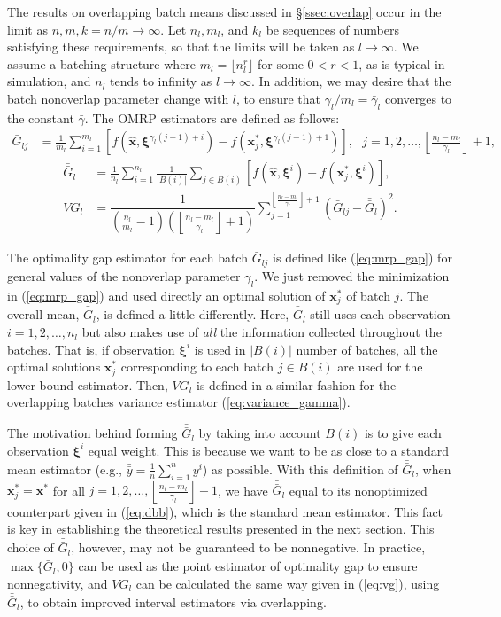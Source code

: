 \documentclass[12pt]{article}
\newcommand{\x}{\mathbf{x}}
\newcommand{\xh}{{\hat{\x}}}
\newcommand{\xs}{\x^*}
\newcommand{\xit}{\boldsymbol{\xi}}
\newcommand{\xiti}{\xit^i}
\newcommand{\nbl}{\left\lfloor\tfrac{n_l-m_l}{\gamma_l}\right\rfloor+1}
\newcommand{\gammab}{\bar{\gamma}}
\newcommand{\gb}{\bar{G}}
\newcommand{\gbb}{\bar{\gb}}
\newcommand{\yb}{\bar{y}}
\newcommand{\ybb}{\bar{\yb}}
\begin{document}
The results on overlapping batch means discussed in \S \ref{ssec:overlap} occur in the limit as $n, m, k=n/m \rightarrow \infty$.  
Let $n_l, m_l$, and $k_l$ be sequences of numbers satisfying these requirements, so that the limits will be taken as $l \rightarrow \infty$.  
We assume a batching structure where $m_l = \lfloor n_l ^r \rfloor$ for some $0<r<1$, as is typical in simulation, and $n_l$ tends to infinity as $l \rightarrow \infty$.  
In addition, we may desire that the batch nonoverlap parameter change with $l$, to ensure that $\gamma_l / m_l = \gammab_l$ converges to the constant $\gammab$.  
The OMRP estimators are defined as follows:
\begin{align}
	\gb_{lj} & = \frac{1}{m_l} \sum_{i=1}^{m_l} \left[ f(\xh,\xit^{\gamma_l(j-1)+i}) - f(\xs_j,\xit^{\gamma_l(j-1)+1}) \right],\ \ \ j = 1, 2, \dots, \nbl, \label{eq:gbar} 
\end{align}
\begin{align}
	\gbb_l & = \frac{1}{n_l} \sum_{i=1}^{n_l} \frac{1}{|B(i)|} \sum_{j \in B(i)} \left[ f(\xh,\xiti) - f(\xs_j,\xiti) \right], \label{eq:gbb} \\
	VG_l & = \dfrac{1}{\left( \tfrac{n_l}{m_l} - 1 \right) \left(\nbl\right)} \sum_{j=1}^{\nbl} (\gb_{lj} - \gbb_l)^2. \label{eq:vg}
\end{align}

The optimality gap estimator for each batch $\gb_{lj}$ is defined like (\ref{eq:mrp_gap}) for general values of the nonoverlap parameter $\gamma_l$.  
We just removed the minimization in (\ref{eq:mrp_gap}) and used directly an optimal solution of $\xs_j$ of batch $j$.  
The overall mean, $\gbb_l$, is defined a little differently.  
Here, $\gbb_l$ still uses each observation $i = 1, 2, \dots, n_l$ but also makes use of {\it all} the information collected throughout the batches.  
That is, if observation $\xiti$ is used in $|B(i)|$ number of batches, all the optimal solutions $\xs_j$ corresponding to each batch $j \in B(i)$ are used for the lower bound estimator.  
Then, $VG_l$ is defined in a similar fashion for the overlapping batches variance estimator (\ref{eq:variance_gamma}).

The motivation behind forming $\gbb_l$ by taking into account $B(i)$ is to give each observation $\xit^i$ equal weight. 
This is because we want to be as close to a standard mean estimator (e.g., $\ybb=\frac{1}{n}\sum_{i=1}^{n} y^i$) as possible.
With this definition of $\gbb_l$, when $\xs_j= \xs$ for all $j= 1, 2, \dots, \nbl$, we have $\gbb_l$ equal to its nonoptimized counterpart given in (\ref{eq:dbb}), which is the standard mean estimator. 
This fact is key in establishing the theoretical results presented in the next section. 
This choice of $\gbb_l$, however, may not be guaranteed to be nonnegative.
In practice, $\max\{\gbb_l,0\}$ can be used as the point estimator of optimality gap to ensure nonnegativity, and $VG_l$ can be calculated the same way given in (\ref{eq:vg}), using $\gbb_l$, to obtain improved interval estimators via overlapping. 
\end{document}
